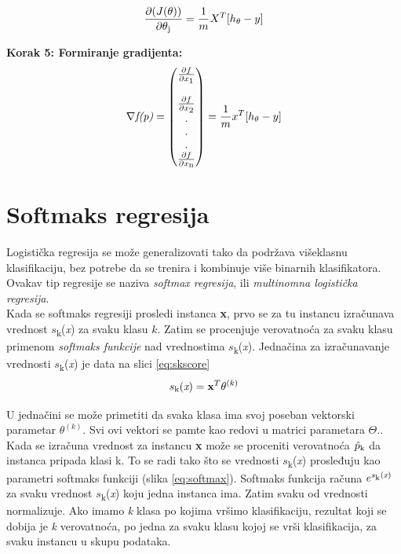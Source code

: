 \documentclass[a4paper,12pt]{report}
\begin{document}
\begin{equation}
\frac{\partial (J(\theta))}{\partial \theta\textsubscript{j}}  = \frac{1}{m} X^T [ h\textsubscript {$\theta$} - y ]
\end{equation} 

\textbf{Korak 5: Formiranje gradijenta:}
\begin{equation}
\begin{split}
\nabla \textit{f(p)} = 
\begin{pmatrix} \frac{\partial f}{\partial x \textsubscript{1}} \\\\ \frac{\partial f}{\partial x\textsubscript{2}} \\.\\ .\\.\\ \frac{\partial f}{\partial x\textsubscript{n}} \end{pmatrix}
= \frac{1}{m} x^T [ h\textsubscript {$\theta$} - y ]
\end{split}
\end{equation}
\section{Softmaks regresija}

Logistička regresija se može generalizovati tako da podržava višeklasnu klasifikaciju, bez potrebe da se trenira i kombinuje više binarnih klasifikatora. Ovakav tip regresije se naziva \textit{softmax regresija}, ili \textit{multinomna logistička regresija}. \\

Kada se softmaks regresiji prosledi instanca \textbf{x}, prvo se za tu instancu izračunava vrednost $s$\textsubscript{k}(\textit{x}) za svaku klasu $k$. Zatim se procenjuje verovatnoća za svaku klasu primenom \textit{softmaks funkcije} nad vrednostima $s$\textsubscript{k}(\textit{x}). Jednačina za izračunavanje vrednosti $s$\textsubscript{k}(\textit{x}) je data na slici \ref{eq:skscore}
\begin{equation} \label{eq:skscore}
	 s\textsubscript{k}(\textit{x}) =  \textbf{x}^T\theta^{(k)}
\end{equation}

U jednačini se može primetiti da svaka klasa ima svoj poseban vektorski parametar $\theta^{(k)}$. Svi ovi vektori se pamte kao redovi u matrici parametara $\Theta.$. Kada se izračuna vrednost za instancu \textbf{x} može se proceniti verovatnoća $\hat{p}\textsubscript{k}$ da instanca pripada klasi k. To se radi tako što se vrednosti $s$\textsubscript{k}(\textit{x}) prosleđuju kao parametri softmaks funkciji (slika \ref{eq:softmax}). Softmaks funkcija računa $e^{s\textsubscript{k}(\textit{x})}$ za svaku vrednost $s$\textsubscript{k}(\textit{x}) koju jedna instanca ima. Zatim svaku od vrednosti normalizuje. Ako imamo \textit{k} klasa po kojima vršimo klasifikaciju, rezultat koji se dobija je \textit{k} verovatnoća, po jedna za svaku klasu kojoj se vrši klasifikacija, za svaku instancu u skupu podataka. 
\end{document}
